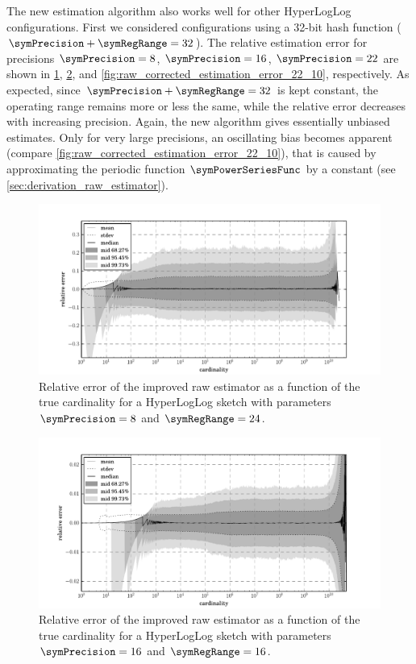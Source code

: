 \documentclass[a4paper]{scrartcl}
\begin{document}
The new estimation algorithm also works well for other HyperLogLog configurations. First we considered configurations using a 32-bit hash function ($\symPrecision + \symRegRange = 32$). The relative estimation error for precisions $\symPrecision=8$, $\symPrecision=16$, $\symPrecision=22$ are shown in \cref{fig:raw_corrected_estimation_error_8_24}, \cref{fig:raw_corrected_estimation_error_16_16}, and \cref{fig:raw_corrected_estimation_error_22_10}, respectively. As expected, since  $\symPrecision + \symRegRange = 32$ is kept constant, the operating range remains more or less the same, while the relative error decreases with increasing precision. Again, the new algorithm gives essentially unbiased estimates. Only for very large precisions, an oscillating bias becomes apparent (compare \cref{fig:raw_corrected_estimation_error_22_10}), that is caused by approximating the periodic function $\symPowerSeriesFunc$ by a constant (see \cref{sec:derivation_raw_estimator}).

\begin{figure}
\centering
\includegraphics[width=1\textwidth]{raw_corrected_estimate_8_24}
\caption{Relative error of the improved raw estimator as a function of the true cardinality for a HyperLogLog sketch with parameters $\symPrecision = 8$ and $\symRegRange=24$.}
\label{fig:raw_corrected_estimation_error_8_24}
\end{figure}

\begin{figure}
\centering
\includegraphics[width=1\textwidth]{raw_corrected_estimate_16_16}
\caption{Relative error of the improved raw estimator as a function of the true cardinality for a HyperLogLog sketch with parameters $\symPrecision = 16$ and $\symRegRange=16$.}
\label{fig:raw_corrected_estimation_error_16_16}
\end{figure}
\end{document}
